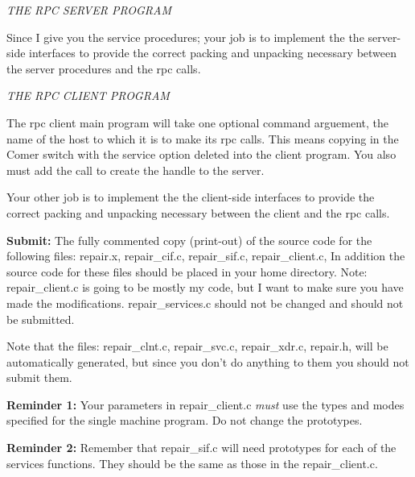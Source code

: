 {\it THE RPC SERVER PROGRAM}

Since I give you the service procedures;
your job is to implement the the server-side interfaces to provide
the correct packing and unpacking necessary between the server procedures
and the rpc calls.

{\it THE RPC CLIENT PROGRAM}

The rpc client main program will take one optional command arguement,
the name of the host to which it is to make its rpc calls.
This means copying in the Comer switch with the service
option deleted into the client program.
You also must add the call to create the handle to the server.

Your other job is to implement the the client-side interfaces to provide the
correct packing and unpacking necessary between the client and the rpc calls.

{\bf Submit:} The fully commented copy (print-out) of the source code
for the following files:
{\ltt{}repair.x},
{\ltt{}repair_cif.c},
{\ltt{}repair_sif.c},
{\ltt{}repair_client.c},
In addition the source code for these files should be placed in your home
directory.
Note: {\ltt{}repair_client.c} is going to be mostly my code,
but I want to make sure you have made the modifications.
{\ltt{}repair_services.c} should not be changed
and should not be submitted.

Note that the files:
{\ltt{}repair_clnt.c},
{\ltt{}repair_svc.c},
{\ltt{}repair_xdr.c},
{\ltt{}repair.h},
will be automatically generated, but since you don't do anything to them
you should not submit them.

{\bf Reminder 1:}
Your parameters in 
{\ltt{}repair_client.c}
{\it must} use the types and modes specified for the single machine program.
Do not change the prototypes.

{\bf Reminder 2:}
Remember that {\ltt{}repair_sif.c}
will need prototypes for each of the services functions.
They should be the same as those in the {\ltt{}repair_client.c}.

\bye
